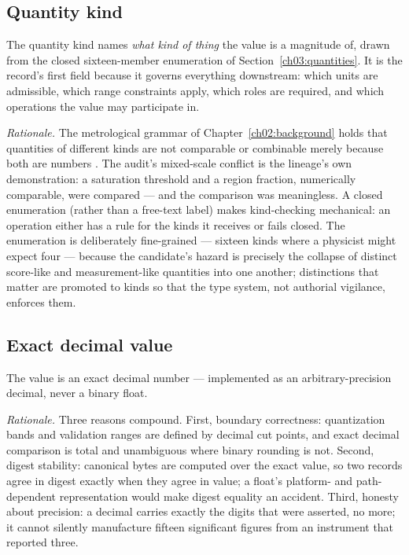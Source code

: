 \subsection{Quantity kind}\label{ch03:field:qkind}

The quantity kind names \emph{what kind of thing} the value is a magnitude of, drawn from the closed sixteen-member enumeration of Section~\ref{ch03:quantities}. It is the record's first field because it governs everything downstream: which units are admissible, which range constraints apply, which roles are required, and which operations the value may participate in.

\emph{Rationale.} The metrological grammar of Chapter~\ref{ch02:background} holds that quantities of different kinds are not comparable or combinable merely because both are numbers \cite{vim}. The audit's mixed-scale conflict is the lineage's own demonstration: a saturation threshold and a region fraction, numerically comparable, were compared --- and the comparison was meaningless. A closed enumeration (rather than a free-text label) makes kind-checking mechanical: an operation either has a rule for the kinds it receives or fails closed. The enumeration is deliberately fine-grained --- sixteen kinds where a physicist might expect four --- because the candidate's hazard is precisely the collapse of distinct score-like and measurement-like quantities into one another; distinctions that matter are promoted to kinds so that the type system, not authorial vigilance, enforces them.

\subsection{Exact decimal value}\label{ch03:field:value}

The value is an exact decimal number --- implemented as an arbitrary-precision decimal, never a binary float.

\emph{Rationale.} Three reasons compound. First, boundary correctness: quantization bands and validation ranges are defined by decimal cut points, and exact decimal comparison is total and unambiguous where binary rounding is not. Second, digest stability: canonical bytes are computed over the exact value, so two records agree in digest exactly when they agree in value; a float's platform- and path-dependent representation would make digest equality an accident. Third, honesty about precision: a decimal carries exactly the digits that were asserted, no more; it cannot silently manufacture fifteen significant figures from an instrument that reported three.

